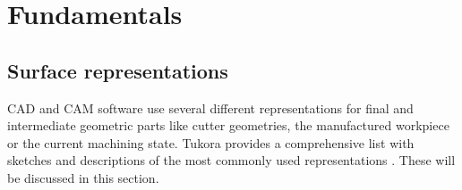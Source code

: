 \chapter{Fundamentals} %
\label{ch:fundamentals}

\section{Surface representations}
\label{sec:surface_representations}

CAD and CAM software use several different representations for final and intermediate geometric parts like cutter geometries, the manufactured workpiece or the current machining state.
Tukora provides a comprehensive list with sketches and descriptions of the most commonly used representations \cite{virtual_machining_review}. These will be discussed in this section. 

